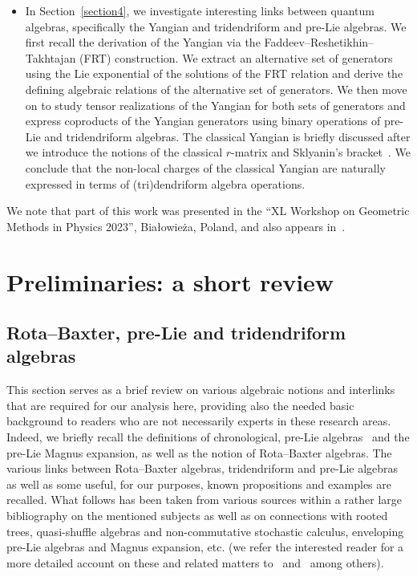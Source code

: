 \documentclass[10pt,a4paper]{amsart}
\numberwithin{equation}{section}
\theoremstyle{definition}
\begin{document}
\begin{itemize}
\item In Section~\ref{section4}, we investigate {interesting links} between quantum algebras, specifically the Yangian and tridendriform and pre-Lie algebras. We first recall the derivation of the Yangian via the Faddeev--Reshetikhin--Takhtajan (FRT) construction. We extract an alternative set of generators using the Lie exponential of the solutions of the FRT relation and derive the defining algebraic relations of the alternative set of generators. We then move on to study tensor realizations of the Yangian for both sets of generators and express coproducts of the Yangian generators using binary operations of pre-Lie and tridendriform algebras. The classical Yangian is briefly discussed after we introduce the notions of the classical $r$-matrix and Sklyanin's bracket~\cite{FT}. We conclude that the non-local charges of the classical Yangian are naturally expressed in terms of (tri)dendriform algebra operations.
\end{itemize}

We note that part of this work was presented in the ``XL Workshop on Geometric Methods in Physics 2023'', Bia{\l}owie\.{z}a, Poland, and also appears in~\cite{DoikouBal}.

\section{Preliminaries: a short review}
\subsection{Rota--Baxter, pre-Lie and tridendriform algebras}\label{section2.1}

 This section serves as a brief review on various algebraic notions and interlinks that are required for our analysis here, providing also the needed basic background to readers who are not necessarily experts in these research areas. Indeed, we briefly recall the definitions of chronological, pre-Lie algebras~\cite{Chrono, PreLie} and the pre-Lie Magnus expansion, as well as the notion of Rota--Baxter algebras.
The various links between Rota--Baxter algebras, tridendriform and pre-Lie algebras as well as some useful, for our purposes, known propositions and examples are recalled. What follows has been taken from various sources within a rather large bibliography on the mentioned subjects as well as on connections with rooted trees, quasi-shuffle algebras and non-commutative stochastic calculus, enveloping pre-Lie algebras and Magnus expansion, etc. (we refer the interested reader for a more detailed account on these and related matters to~\cite{Bai, Ebra2, new5,Fer, EbraMan,new3, new4, Manchon} and~\cite{tree1, tree2} among others).
\end{document}
